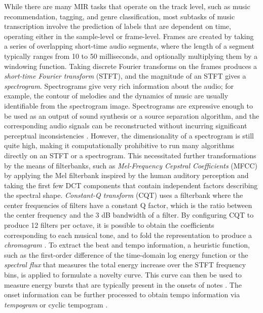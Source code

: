 While there are many MIR tasks that operate on the track level, such as music recommendation, tagging, and genre classification, most subtasks of music transcription involve the prediction of labels that are dependent on time, operating either in the sample-level or frame-level.
Frames are created by taking a series of overlapping short-time audio segments, where the length of a segment typically ranges from 10 to 50 milliseconds, and optionally multiplying them by a windowing function.
Taking discrete Fourier transforms on the frames produces a \emph{short-time Fourier transform} (STFT), and the magnitude of an STFT gives a \emph{spectrogram}.
Spectrograms give very rich information about the audio; for example, the contour of melodies and the dynamics of music are usually identifiable from the spectrogram image.
Spectrograms are expressive enough to be used as an output of sound synthesis or a source separation algorithm, and the corresponding audio signals can be reconstructed without incurring significant perceptual inconsistencies \cite{griffin1984lim, leroux2010spectrogram}.
However, the dimensionality of a spectrogram is still quite high, making it computationally prohibitive to run many algorithms directly on an STFT or a spectrogram.
This necessitated further transformations by the means of filterbanks, such as \emph{Mel-Frequency Cepstral Coefficients} (MFCC) \cite{logan2000mfcc} by applying the Mel filterbank inspired by the human auditory perception and taking the first few DCT components that contain independent factors describing the spectral shape.
\emph{Constant-Q transform} (CQT) \cite{schorkhuber2010cqt} uses a filterbank where the center frequencies of filters have a constant Q factor, which is the ratio between the center frequency and the 3 dB bandwidth of a filter.
By configuring CQT to produce 12 filters per octave, it is possible to obtain the coefficients corresponding to each musical tone, and to fold the representation to produce a \emph{chromagram} \cite{harte2005chromagram}.
To extract the beat and tempo information, a heuristic function, such as the first-order difference of the time-domain log energy function or the \emph{spectral flux} that measures the total energy increase over the STFT frequency bins, is applied to formulate a novelty curve.
This curve can then be used to measure energy bursts that are typically present in the onsets of notes \cite{bello2005onset}.
The onset information can be further processed to obtain tempo information via \emph{tempogram} \cite{cemgil2000tempogram} or cyclic tempogram \cite{grosche2010tempogram}.


